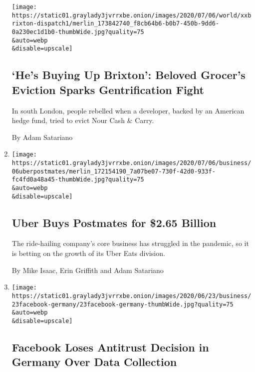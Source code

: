 \begin{enumerate}
  \texttt{[image: https://static01.graylady3jvrrxbe.onion/images/2020/07/06/world/xxbrixton-dispatch1/merlin\_173842740\_f8cb64b6-b0b7-450b-9dd6-0a230ec1d1b0-thumbWide.jpg?quality=75\\\&auto=webp\\\&disable=upscale]}

  \hypertarget{hes-buying-up-brixton-beloved-grocers-eviction-sparks-gentrification-fight}{%
  \subsection{`He's Buying Up Brixton': Beloved Grocer's Eviction Sparks
  Gentrification
  Fight}\label{hes-buying-up-brixton-beloved-grocers-eviction-sparks-gentrification-fight}}

  In south London, people rebelled when a developer, backed by an
  American hedge fund, tried to evict Nour Cash \& Carry.

  By Adam Satariano
\item
  \href{/2020/07/05/technology/uber-postmates-deal.html}{}

  \texttt{[image: https://static01.graylady3jvrrxbe.onion/images/2020/07/06/business/06uberpostmates/merlin\_172154190\_7a07be07-730f-42d0-933f-fc4fd0a48a45-thumbWide.jpg?quality=75\\\&auto=webp\\\&disable=upscale]}

  \hypertarget{uber-buys-postmates-for-265-billion}{%
  \subsection{Uber Buys Postmates for \$2.65
  Billion}\label{uber-buys-postmates-for-265-billion}}

  The ride-hailing company's core business has struggled in the
  pandemic, so it is betting on the growth of its Uber Eats division.

  By Mike Isaac, Erin Griffith and Adam Satariano
\item
  \href{/2020/06/23/technology/facebook-antitrust-germany.html}{}

  \texttt{[image: https://static01.graylady3jvrrxbe.onion/images/2020/06/23/business/23facebook-germany/23facebook-germany-thumbWide.jpg?quality=75\\\&auto=webp\\\&disable=upscale]}

  \hypertarget{facebook-loses-antitrust-decision-in-germany-over-data-collection}{%
  \subsection{Facebook Loses Antitrust Decision in Germany Over Data
  Collection}\label{facebook-loses-antitrust-decision-in-germany-over-data-collection}}


\end{enumerate}
